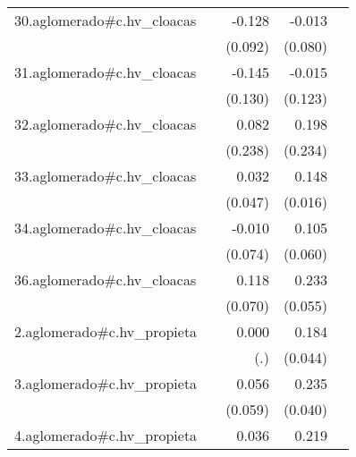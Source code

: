 {\begin{longtable}{l*{4}{D{.}{.}{-1}}}
\addlinespace
30.aglomerado#c.hv\_cloacas&                     &      -0.128         &      -0.013         &                     \\
            &                     &     (0.092)         &     (0.080)         &                     \\
\addlinespace
31.aglomerado#c.hv\_cloacas&                     &      -0.145         &      -0.015         &                     \\
            &                     &     (0.130)         &     (0.123)         &                     \\
\addlinespace
32.aglomerado#c.hv\_cloacas&                     &       0.082         &       0.198         &                     \\
            &                     &     (0.238)         &     (0.234)         &                     \\
\addlinespace
33.aglomerado#c.hv\_cloacas&                     &       0.032         &       0.148\sym{***}&                     \\
            &                     &     (0.047)         &     (0.016)         &                     \\
\addlinespace
34.aglomerado#c.hv\_cloacas&                     &      -0.010         &       0.105         &                     \\
            &                     &     (0.074)         &     (0.060)         &                     \\
\addlinespace
36.aglomerado#c.hv\_cloacas&                     &       0.118         &       0.233\sym{***}&                     \\
            &                     &     (0.070)         &     (0.055)         &                     \\
\addlinespace
2.aglomerado#c.hv\_propieta&                     &       0.000         &       0.184\sym{***}&                     \\
            &                     &         (.)         &     (0.044)         &                     \\
\addlinespace
3.aglomerado#c.hv\_propieta&                     &       0.056         &       0.235\sym{***}&                     \\
            &                     &     (0.059)         &     (0.040)         &                     \\
\addlinespace
4.aglomerado#c.hv\_propieta&                     &       0.036         &       0.219\sym{***}&                     \\

\end{longtable}}
